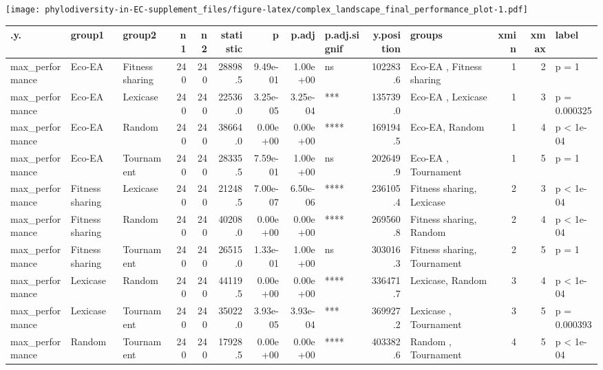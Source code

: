 \documentclass[]{book}
\newenvironment{Shaded}{\begin{snugshade}}{\end{snugshade}}
\newcommand{\DataTypeTok}[1]{\textcolor[rgb]{0.13,0.29,0.53}{#1}}
\newcommand{\KeywordTok}[1]{\textcolor[rgb]{0.13,0.29,0.53}{\textbf{#1}}}
\newcommand{\NormalTok}[1]{#1}
\newcommand{\OperatorTok}[1]{\textcolor[rgb]{0.81,0.36,0.00}{\textbf{#1}}}
\newcommand{\StringTok}[1]{\textcolor[rgb]{0.31,0.60,0.02}{#1}}
\begin{document}
\texttt{[image: phylodiversity-in-EC-supplement\_files/figure-latex/complex\_landscape\_final\_performance\_plot-1.pdf]}

\begin{Shaded}
\end{Shaded}

\begin{table}
\centering
\begin{tabular}[t]{l|l|l|r|r|r|r|r|l|r|l|r|r|l}
\hline
.y. & group1 & group2 & n1 & n2 & statistic & p & p.adj & p.adj.signif & y.position & groups & xmin & xmax & label\\
\hline
max\_performance & Eco-EA & Fitness sharing & 240 & 240 & 28898.5 & 9.49e-01 & 1.00e+00 & ns & 102283.6 & Eco-EA         , Fitness sharing & 1 & 2 & p = 1\\
\hline
max\_performance & Eco-EA & Lexicase & 240 & 240 & 22536.0 & 3.25e-05 & 3.25e-04 & *** & 135739.0 & Eco-EA  , Lexicase & 1 & 3 & p = 0.000325\\
\hline
max\_performance & Eco-EA & Random & 240 & 240 & 38664.0 & 0.00e+00 & 0.00e+00 & **** & 169194.5 & Eco-EA, Random & 1 & 4 & p < 1e-04\\
\hline
max\_performance & Eco-EA & Tournament & 240 & 240 & 28335.5 & 7.59e-01 & 1.00e+00 & ns & 202649.9 & Eco-EA    , Tournament & 1 & 5 & p = 1\\
\hline
max\_performance & Fitness sharing & Lexicase & 240 & 240 & 21248.5 & 7.00e-07 & 6.50e-06 & **** & 236105.4 & Fitness sharing, Lexicase & 2 & 3 & p < 1e-04\\
\hline
max\_performance & Fitness sharing & Random & 240 & 240 & 40208.0 & 0.00e+00 & 0.00e+00 & **** & 269560.8 & Fitness sharing, Random & 2 & 4 & p < 1e-04\\
\hline
max\_performance & Fitness sharing & Tournament & 240 & 240 & 26515.0 & 1.33e-01 & 1.00e+00 & ns & 303016.3 & Fitness sharing, Tournament & 2 & 5 & p = 1\\
\hline
max\_performance & Lexicase & Random & 240 & 240 & 44119.5 & 0.00e+00 & 0.00e+00 & **** & 336471.7 & Lexicase, Random & 3 & 4 & p < 1e-04\\
\hline
max\_performance & Lexicase & Tournament & 240 & 240 & 35022.0 & 3.93e-05 & 3.93e-04 & *** & 369927.2 & Lexicase  , Tournament & 3 & 5 & p = 0.000393\\
\hline
max\_performance & Random & Tournament & 240 & 240 & 17928.5 & 0.00e+00 & 0.00e+00 & **** & 403382.6 & Random    , Tournament & 4 & 5 & p < 1e-04\\
\hline
\end{tabular}
\end{table}
\end{document}
